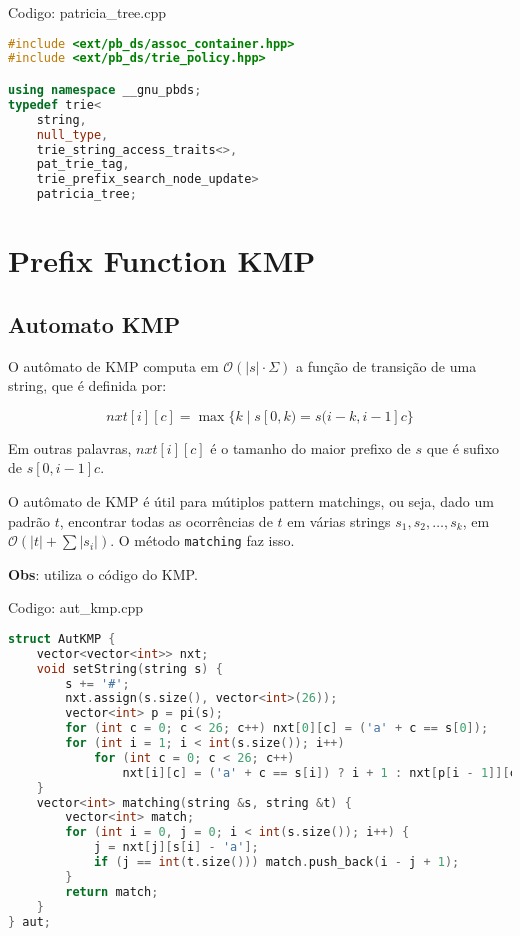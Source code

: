 \documentclass[10pt, a4paper, oneside]{book}
\begin{document}
\hfill

Codigo: patricia\_tree.cpp

\begin{lstlisting}[language=C++]
#include <ext/pb_ds/assoc_container.hpp>
#include <ext/pb_ds/trie_policy.hpp>

using namespace __gnu_pbds;
typedef trie<
    string,
    null_type,
    trie_string_access_traits<>,
    pat_trie_tag,
    trie_prefix_search_node_update>
    patricia_tree;
\end{lstlisting}
\hfill

\section{Prefix Function KMP}
\subsection{Automato KMP}


O autômato de KMP computa em $\mathcal{O}(|s| \cdot \Sigma)$ a função de transição de uma string, que é definida por:



$$ nxt[i][c] = \max\{k \mid s[0,k) = s(i-k,i-1]c\} $$



Em outras palavras, $nxt[i][c]$ é o tamanho do maior prefixo de $s$ que é sufixo de $s[0,i-1]c$.



O autômato de KMP é útil para mútiplos pattern matchings, ou seja, dado um padrão $t$, encontrar todas as ocorrências de $t$ em várias strings $s_1, s_2, \dots, s_k$, em $\mathcal{O}(|t| + \sum |s_i|)$. O método \texttt{matching} faz isso.



\textbf{Obs}: utiliza o código do KMP.
\hfill

Codigo: aut\_kmp.cpp

\begin{lstlisting}[language=C++]
struct AutKMP {
    vector<vector<int>> nxt;
    void setString(string s) {
        s += '#';
        nxt.assign(s.size(), vector<int>(26));
        vector<int> p = pi(s);
        for (int c = 0; c < 26; c++) nxt[0][c] = ('a' + c == s[0]);
        for (int i = 1; i < int(s.size()); i++)
            for (int c = 0; c < 26; c++)
                nxt[i][c] = ('a' + c == s[i]) ? i + 1 : nxt[p[i - 1]][c];
    }
    vector<int> matching(string &s, string &t) {
        vector<int> match;
        for (int i = 0, j = 0; i < int(s.size()); i++) {
            j = nxt[j][s[i] - 'a'];
            if (j == int(t.size())) match.push_back(i - j + 1);
        }
        return match;
    }
} aut;
\end{lstlisting}
\hfill
\end{document}
